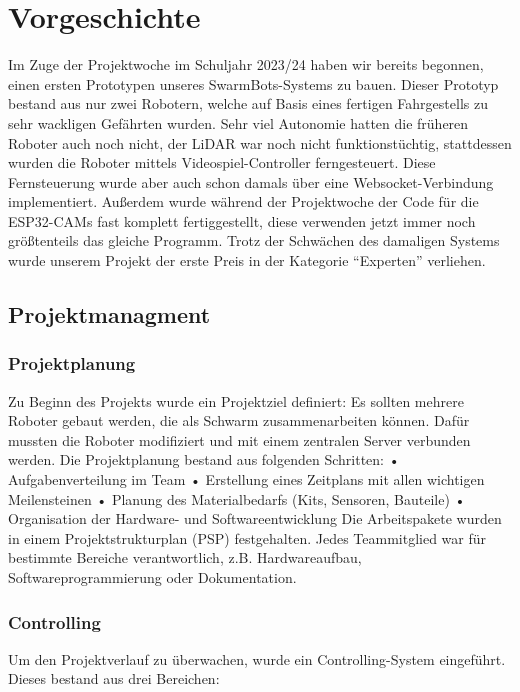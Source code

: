 \chapter{Vorgeschichte}
\label{sec:vorgeschichte}
Im Zuge der Projektwoche im Schuljahr 2023/24 haben wir bereits begonnen,
einen ersten Prototypen unseres SwarmBots-Systems zu bauen.
%
Dieser Prototyp bestand aus nur zwei Robotern,
welche auf Basis eines fertigen Fahrgestells zu sehr wackligen Gefährten wurden.
%
Sehr viel Autonomie hatten die früheren Roboter auch noch nicht,
der LiDAR war noch nicht funktionstüchtig,
stattdessen wurden die Roboter mittels Videospiel-Controller ferngesteuert.
%
Diese Fernsteuerung wurde aber auch schon damals über eine Websocket-Verbindung implementiert.
%
Außerdem wurde während der Projektwoche der Code für die ESP32-CAMs fast komplett fertiggestellt,
diese verwenden jetzt immer noch größtenteils das gleiche Programm.
%
Trotz der Schwächen des damaligen Systems wurde unserem Projekt
der erste Preis in der Kategorie ``Experten'' verliehen.


\section{Projektmanagment}
\label{subsec:projektmanagment}
%
\subsection{Projektplanung}
%
Zu Beginn des Projekts wurde ein Projektziel definiert:
Es sollten mehrere Roboter gebaut werden, die als Schwarm zusammenarbeiten können. Dafür mussten die Roboter modifiziert und mit einem zentralen Server verbunden werden.
Die Projektplanung bestand aus folgenden Schritten:
•	Aufgabenverteilung im Team
•	Erstellung eines Zeitplans mit allen wichtigen Meilensteinen
•	Planung des Materialbedarfs (Kits, Sensoren, Bauteile)
•	Organisation der Hardware- und Softwareentwicklung
Die Arbeitspakete wurden in einem Projektstrukturplan (PSP) festgehalten.
Jedes Teammitglied war für bestimmte Bereiche verantwortlich, z.B. Hardwareaufbau, Softwareprogrammierung oder Dokumentation.
%
\subsection{Controlling}
Um den Projektverlauf zu überwachen, wurde ein Controlling-System eingeführt. Dieses bestand aus drei Bereichen:
